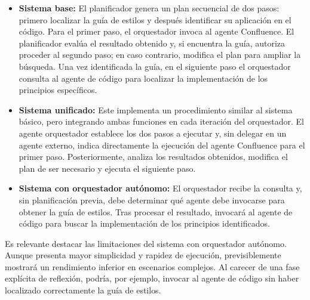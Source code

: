 \begin{itemize}

\item\textbf{Sistema base: } El planificador genera un plan secuencial de dos pasos: primero localizar la guía de estilos y después identificar su aplicación en el código. Para el primer paso, el orquestador invoca al agente Confluence. El planificador evalúa el resultado obtenido y, si encuentra la guía, autoriza proceder al segundo paso; en caso contrario, modifica el plan para ampliar la búsqueda. Una vez identificada la guía, en el siguiente paso el orquestador consulta al agente de código para localizar la implementación de los principios específicos.

\item\textbf{Sistema unificado:} Este implementa un procedimiento similar al sistema básico, pero integrando ambas funciones en cada iteración del orquestador. El agente orquestador establece los dos pasos a ejecutar y, sin delegar en un agente externo, indica directamente la ejecución del agente Confluence para el primer paso. Posteriormente, analiza los resultados obtenidos, modifica el plan de ser necesario y ejecuta el siguiente paso.

\item\textbf{Sistema con orquestador autónomo:} El orquestador recibe la consulta y, sin planificación previa, debe determinar qué agente debe invocarse para obtener la guía de estilos. Tras procesar el resultado, invocará al agente de código para buscar la implementación de los principios identificados.
\end{itemize}

Es relevante destacar las limitaciones del sistema con orquestador autónomo. Aunque presenta mayor simplicidad y rapidez de ejecución, previsiblemente mostrará un rendimiento inferior en escenarios complejos. Al carecer de una fase explícita de reflexión, podría, por ejemplo, invocar al agente de código sin haber localizado correctamente la guía de estilos.
